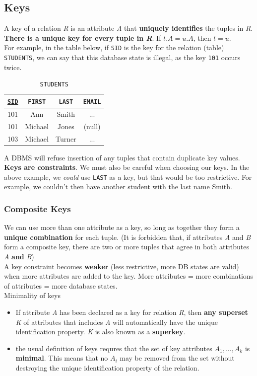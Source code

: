 \documentclass{article}
\begin{document}
\subsection*{Keys}
A key of a relation \textit{R} is an attribute \textit{A} that \textbf{uniquely identifies} the tuples in \textit{R}.
\\\textbf{There is a unique key for every tuple in \textit{R}}. If $t.A = u.A$, then $t = u$.
\\For example, in the table below, if \texttt{SID} is the key for the relation (table) \texttt{STUDENTS}, we can say that this database state is illegal, as the key \texttt{101} occurs twice.
\begin{table}[H]
\begin{center}
 \begin{tabular}{| c | c | c | c |} 
 \hline
 \underline{\texttt{SID}} & \texttt{FIRST} & \texttt{LAST} & \texttt{EMAIL} \\ [0.5ex] 
 \hline
 101 & Ann & Smith & ... \\
 101 & Michael & Jones & (null) \\
 103 & Michael & Turner & ... \\
 \hline
\end{tabular}
\end{center}
\caption{\texttt{STUDENTS}}
\end{table}
A DBMS will refuse insertion of any tuples that contain duplicate key values.
\\\textbf{Keys are constraints}. We must also be careful when choosing our keys. In the above example, we \textit{could} use \texttt{LAST} as a key, but that would be too restrictive. For example, we couldn't then have another student with the last name Smith.

\subsubsection*{Composite Keys}
We can use more than one attribute as a key, so long as together they form a \textbf{unique combination} for each tuple. (It is forbidden that, if attributes \textit{A} and \textit{B} form a composite key, there are two or more tuples that agree in both attributes \textit{A} \textbf{and} \textit{B})
\\A key constraint becomes \textbf{weaker} (less restrictive, more DB states are valid) when more attributes are added to the key. More attributes = more combinations of attributes = more database states.
\\Minimality of keys
\begin{itemize}
    \item If attribute \textit{A} has been declared as a key for relation \textit{R}, then \textbf{any superset} \textit{K} of attributes that includes \textit{A} will automatically have the unique identification property. \textit{K} is also known as a \textbf{superkey}.
    \item the usual definition of keys requres that the set of key attributes ${A_1, ..., A_k}$ is \textbf{minimal}. This means that no $A_i$ may be removed from the set without destroying the unique identification property of the relation.
\end{itemize}
\end{document}
